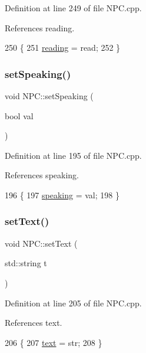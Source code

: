 Definition at line 249 of file N\+P\+C.\+cpp.



References reading.


\begin{DoxyCode}
250 \{
251     \hyperlink{class_n_p_c_a04d8f196cdd6de84f38131836d9c9cc7}{reading} = read;
252 \}
\end{DoxyCode}
\mbox{\label{class_n_p_c_a16d67a6d98c54df2fe320c64c5680285}} 
\subsubsection{\texorpdfstring{set\+Speaking()}{setSpeaking()}}
{\footnotesize\ttfamily void N\+P\+C\+::set\+Speaking (\begin{DoxyParamCaption}\item[{bool}]{val }\end{DoxyParamCaption})}



Definition at line 195 of file N\+P\+C.\+cpp.



References speaking.


\begin{DoxyCode}
196 \{
197     \hyperlink{class_n_p_c_a0dc17cd2d9b7d486e6d74089819117e7}{speaking} = val;
198 \}
\end{DoxyCode}
\mbox{\label{class_n_p_c_ae94160d4a1fe8d5195e9ae66f78059ce}} 
\subsubsection{\texorpdfstring{set\+Text()}{setText()}}
{\footnotesize\ttfamily void N\+P\+C\+::set\+Text (\begin{DoxyParamCaption}\item[{std\+::string}]{t }\end{DoxyParamCaption})}



Definition at line 205 of file N\+P\+C.\+cpp.



References text.


\begin{DoxyCode}
206 \{
207     \hyperlink{class_n_p_c_a64ad332dcfeb84a7a6bedd404378f05b}{text} = str;
208 \}
\end{DoxyCode}


